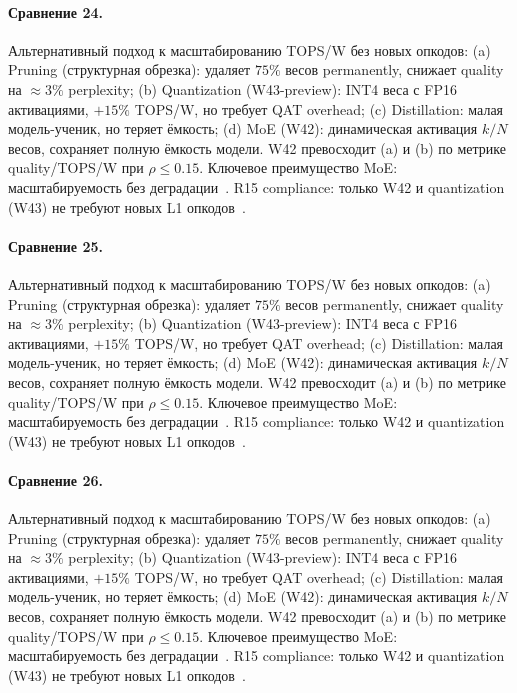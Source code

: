 \paragraph{Сравнение 24.} Альтернативный подход к масштабированию TOPS/W без новых опкодов: (a) Pruning (структурная обрезка): удаляет $75\%$ весов permanently, снижает quality на $\approx 3\%$ perplexity; (b) Quantization (W43-preview): INT4 веса с FP16 активациями, $+15\%$ TOPS/W, но требует QAT overhead; (c) Distillation: малая модель-ученик, но теряет ёмкость; (d) MoE (W42): динамическая активация $k/N$ весов, сохраняет полную ёмкость модели. W42 превосходит (a) и (b) по метрике quality/TOPS/W при $\rho \leq 0{.}15$. Ключевое преимущество MoE: масштабируемость без деградации~\cite{switch_transformer2021,mixtral2024}. R15 compliance: только W42 и quantization (W43) не требуют новых L1 опкодов~\cite{lee_gvsu_proof2021}.

\paragraph{Сравнение 25.} Альтернативный подход к масштабированию TOPS/W без новых опкодов: (a) Pruning (структурная обрезка): удаляет $75\%$ весов permanently, снижает quality на $\approx 3\%$ perplexity; (b) Quantization (W43-preview): INT4 веса с FP16 активациями, $+15\%$ TOPS/W, но требует QAT overhead; (c) Distillation: малая модель-ученик, но теряет ёмкость; (d) MoE (W42): динамическая активация $k/N$ весов, сохраняет полную ёмкость модели. W42 превосходит (a) и (b) по метрике quality/TOPS/W при $\rho \leq 0{.}15$. Ключевое преимущество MoE: масштабируемость без деградации~\cite{switch_transformer2021,mixtral2024}. R15 compliance: только W42 и quantization (W43) не требуют новых L1 опкодов~\cite{lee_gvsu_proof2021}.

\paragraph{Сравнение 26.} Альтернативный подход к масштабированию TOPS/W без новых опкодов: (a) Pruning (структурная обрезка): удаляет $75\%$ весов permanently, снижает quality на $\approx 3\%$ perplexity; (b) Quantization (W43-preview): INT4 веса с FP16 активациями, $+15\%$ TOPS/W, но требует QAT overhead; (c) Distillation: малая модель-ученик, но теряет ёмкость; (d) MoE (W42): динамическая активация $k/N$ весов, сохраняет полную ёмкость модели. W42 превосходит (a) и (b) по метрике quality/TOPS/W при $\rho \leq 0{.}15$. Ключевое преимущество MoE: масштабируемость без деградации~\cite{switch_transformer2021,mixtral2024}. R15 compliance: только W42 и quantization (W43) не требуют новых L1 опкодов~\cite{lee_gvsu_proof2021}.


